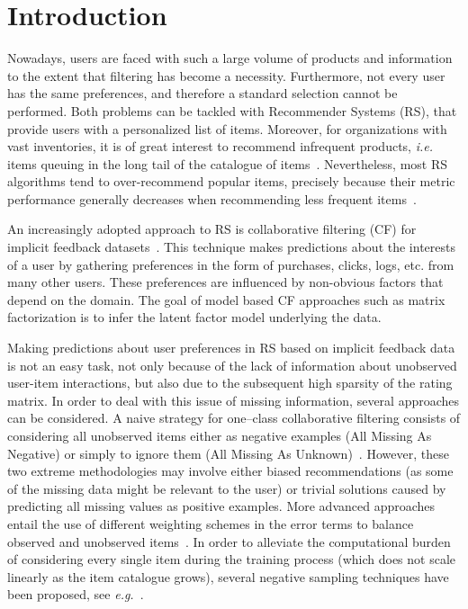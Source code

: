 \section{Introduction}\label{sec:intro}

Nowadays, users are faced with such a large volume of  products and information to the extent that filtering has become a necessity. 
Furthermore, not every user has the same preferences, and therefore a standard selection cannot be performed.
Both problems can be tackled with Recommender Systems (RS), that provide users with a personalized list of items.
Moreover, for organizations with vast inventories, it is of great interest to recommend infrequent products, \emph{i.e.} items queuing in the long tail of the catalogue of items~\cite{Anderson:2006:long_tail}.  
Nevertheless, most RS algorithms tend to over-recommend popular items, precisely because their metric performance generally decreases when recommending less frequent items~\cite{Steck:2011:IPR}.   

An increasingly adopted approach to RS is collaborative filtering (CF) for implicit feedback datasets~\cite{HuKoren:2008:CF_implicit, Pan:2008:OCCF}.
This technique makes predictions about the interests of a user
by gathering  preferences in the form of purchases, clicks, logs, etc. from many other users.
These preferences are influenced by non-obvious factors that depend on the domain.
The goal of model based CF approaches such as matrix factorization is to infer
the latent factor model underlying the data.

Making predictions about user preferences in RS based on implicit feedback data is not an easy task, not only because of  the lack of information about unobserved user-item interactions, but also due to the subsequent high sparsity of the rating matrix.
In order to deal with this issue of missing information, several approaches can be considered. 
A naive strategy for one--class collaborative filtering consists of considering all unobserved items either as negative examples (All Missing As Negative) or simply to ignore them (All Missing As Unknown)~\cite{Pan:2008:OCCF}. However, these two extreme methodologies may involve either biased recommendations (as some of the missing data might be relevant to the user) or trivial solutions caused by predicting all missing values as positive examples.
More advanced approaches entail the use of different weighting schemes in the error terms to balance observed and unobserved items~\cite{HuKoren:2008:CF_implicit, Pan:2008:OCCF, Steck:2010:MissingNotAtRandom}. In order to alleviate the computational burden of considering every single item during the training process  (which does not scale linearly as the item catalogue grows), several negative sampling techniques have been proposed, see \emph{e.g.}~\cite{Pan:2008:OCCF}. 

